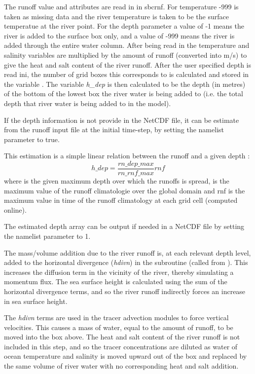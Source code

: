 \documentclass[NEMO_book]{subfiles}
\begin{document}
The runoff value and attributes are read in in sbcrnf.  
For temperature -999 is taken as missing data and the river temperature is taken to be the 
surface temperatue at the river point.
For the depth parameter a value of -1 means the river is added to the surface box only, 
and a value of -999 means the river is added through the entire water column. 
After being read in the temperature and salinity variables are multiplied by the amount of runoff (converted into m/s) 
to give the heat and salt content of the river runoff.
After the user specified depth is read ini, the number of grid boxes this corresponds to is 
calculated and stored in the variable .
The variable \textit{h\_dep} is then calculated to be the depth (in metres) of the bottom of the 
lowest box the river water is being added to (i.e. the total depth that river water is being added to in the model).

If the depth information is not provide in the NetCDF file, it can be estimate from the runoff input file at the initial time-step, by setting the namelist parameter  to true.

This estimation is a simple linear relation between the runoff and a given depth : 
\begin{equation} 
h\_dep  = \frac{rn\_dep\_max} {rn\_rnf\_max}  rnf
\end{equation}
where   is the given maximum depth over which the runoffs is spread, 
  is the maximum value of the runoff climatologie over the global domain
and rnf is the maximum value in time of the runoff climatology at each grid cell (computed online).

The estimated depth array can be output if needed in a NetCDF file by setting the namelist parameter  to 1.

The mass/volume addition due to the river runoff is, at each relevant depth level, added to the horizontal divergence 
(\textit{hdivn}) in the subroutine  (called from ).
This increases the diffusion term in the vicinity of the river, thereby simulating a momentum flux.
The sea surface height is calculated using the sum of the horizontal divergence terms, and so the 
river runoff indirectly forces an increase in sea surface height. 

The \textit{hdivn} terms are used in the tracer advection modules to force vertical velocities.
This causes a mass of water, equal to the amount of runoff, to be moved into the box above. 
The heat and salt content of the river runoff is not included in this step, and so the tracer 
concentrations are diluted as water of ocean temperature and salinity is moved upward out of the box 
and replaced by the same volume of river water with no corresponding heat and salt addition.
\end{document}
